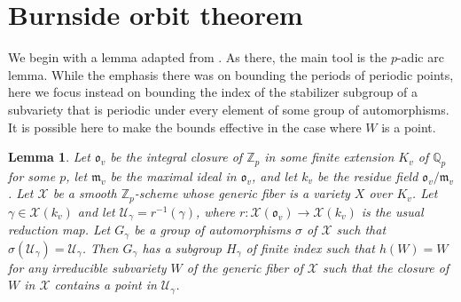 \documentclass{amsart}
\newcommand{\lra}{\longrightarrow}
\newcommand{\bZ} {\mathbb{Z}}
\newcommand{\bQ}{\mathbb{Q}}
\newcommand{\cU}{\mathcal{U}}
\newcommand{\fm}{\mathfrak m}
\newcommand{\fo}{\mathfrak o}
\newcommand{\cX}{\mathcal X}
\newtheorem{lem}[thm]{Lemma}
\theoremstyle{definition}
\begin{document}
\section{Burnside orbit theorem}\label{burn-sec}

We begin with a lemma adapted from \cite{BGT2}.  As there, the main tool
is the $p$-adic arc lemma.  While the emphasis there was on bounding
the periods of periodic points, here we focus instead on bounding
the index of the stabilizer subgroup of a subvariety that is periodic under every
element of some group of automorphisms.  It is possible here to make
the bounds effective in the case where $W$ is a point.  


\begin{lem}\label{basic}
  Let $\fo_v$ be the integral closure of $\bZ_p$ in some finite extension
  $K_v$ of $\bQ_p$ for some $p$, let $\fm_v$ be the maximal ideal in
  $\fo_v$, and let $k_v$ be the residue field $\fo_v/\fm_v$.  Let
  $\cX$ be a smooth $\bZ_p$-scheme whose generic fiber is a variety
  $X$ over $K_v$.  Let $\gamma \in \cX(k_v)$ and let
  $\cU_\gamma = r^{-1}(\gamma)$, where
  $r: \cX(\fo_v) \lra \cX(k_v)$ is the usual reduction map.   Let
  $G_\gamma$ be a group of automorphisms $\sigma$ of $\cX$ such
  that $\sigma(\cU_\gamma) = \cU_\gamma$.  Then $G_\gamma$ has a
  subgroup $H_\gamma$ of finite index such that $h(W) = W$ for any
  irreducible subvariety $W$ of the generic fiber of $\cX$ such that
  the closure of $W$ in $\cX$ contains a point in $\cU_\gamma$.     
\end{lem}
\end{document}

